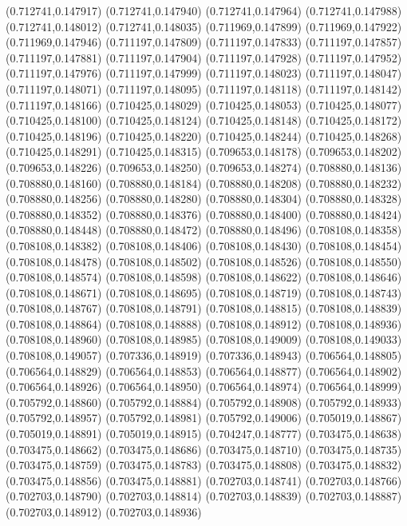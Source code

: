 (0.712741,0.147917)
(0.712741,0.147940)
(0.712741,0.147964)
(0.712741,0.147988)
(0.712741,0.148012)
(0.712741,0.148035)
(0.711969,0.147899)
(0.711969,0.147922)
(0.711969,0.147946)
(0.711197,0.147809)
(0.711197,0.147833)
(0.711197,0.147857)
(0.711197,0.147881)
(0.711197,0.147904)
(0.711197,0.147928)
(0.711197,0.147952)
(0.711197,0.147976)
(0.711197,0.147999)
(0.711197,0.148023)
(0.711197,0.148047)
(0.711197,0.148071)
(0.711197,0.148095)
(0.711197,0.148118)
(0.711197,0.148142)
(0.711197,0.148166)
(0.710425,0.148029)
(0.710425,0.148053)
(0.710425,0.148077)
(0.710425,0.148100)
(0.710425,0.148124)
(0.710425,0.148148)
(0.710425,0.148172)
(0.710425,0.148196)
(0.710425,0.148220)
(0.710425,0.148244)
(0.710425,0.148268)
(0.710425,0.148291)
(0.710425,0.148315)
(0.709653,0.148178)
(0.709653,0.148202)
(0.709653,0.148226)
(0.709653,0.148250)
(0.709653,0.148274)
(0.708880,0.148136)
(0.708880,0.148160)
(0.708880,0.148184)
(0.708880,0.148208)
(0.708880,0.148232)
(0.708880,0.148256)
(0.708880,0.148280)
(0.708880,0.148304)
(0.708880,0.148328)
(0.708880,0.148352)
(0.708880,0.148376)
(0.708880,0.148400)
(0.708880,0.148424)
(0.708880,0.148448)
(0.708880,0.148472)
(0.708880,0.148496)
(0.708108,0.148358)
(0.708108,0.148382)
(0.708108,0.148406)
(0.708108,0.148430)
(0.708108,0.148454)
(0.708108,0.148478)
(0.708108,0.148502)
(0.708108,0.148526)
(0.708108,0.148550)
(0.708108,0.148574)
(0.708108,0.148598)
(0.708108,0.148622)
(0.708108,0.148646)
(0.708108,0.148671)
(0.708108,0.148695)
(0.708108,0.148719)
(0.708108,0.148743)
(0.708108,0.148767)
(0.708108,0.148791)
(0.708108,0.148815)
(0.708108,0.148839)
(0.708108,0.148864)
(0.708108,0.148888)
(0.708108,0.148912)
(0.708108,0.148936)
(0.708108,0.148960)
(0.708108,0.148985)
(0.708108,0.149009)
(0.708108,0.149033)
(0.708108,0.149057)
(0.707336,0.148919)
(0.707336,0.148943)
(0.706564,0.148805)
(0.706564,0.148829)
(0.706564,0.148853)
(0.706564,0.148877)
(0.706564,0.148902)
(0.706564,0.148926)
(0.706564,0.148950)
(0.706564,0.148974)
(0.706564,0.148999)
(0.705792,0.148860)
(0.705792,0.148884)
(0.705792,0.148908)
(0.705792,0.148933)
(0.705792,0.148957)
(0.705792,0.148981)
(0.705792,0.149006)
(0.705019,0.148867)
(0.705019,0.148891)
(0.705019,0.148915)
(0.704247,0.148777)
(0.703475,0.148638)
(0.703475,0.148662)
(0.703475,0.148686)
(0.703475,0.148710)
(0.703475,0.148735)
(0.703475,0.148759)
(0.703475,0.148783)
(0.703475,0.148808)
(0.703475,0.148832)
(0.703475,0.148856)
(0.703475,0.148881)
(0.702703,0.148741)
(0.702703,0.148766)
(0.702703,0.148790)
(0.702703,0.148814)
(0.702703,0.148839)
(0.702703,0.148887)
(0.702703,0.148912)
(0.702703,0.148936)

